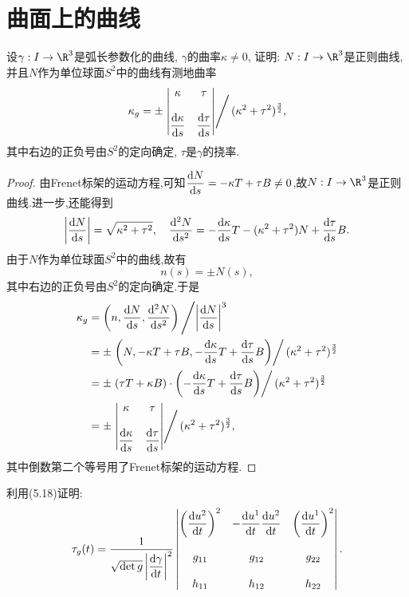 \section{曲面上的曲线}
\begin{excise}
		设$\gamma: I\to \R^{3}$是弧长参数化的曲线, $\gamma$的曲率$\kappa \neq 0$,
		证明: $N:I\to\R^{3}$是正则曲线,并且$N$作为单位球面$S^{2}$中的曲线有测地曲率
		$$
		\kappa_{g}=\pm\left.
		\begin{vmatrix}
			\kappa&\tau\\ \\
			\dfrac{\mathrm{d}\kappa}{\mathrm{d} s}&\dfrac{\mathrm{d}\tau}{\mathrm{d} s}
		\end{vmatrix}\right/(\kappa^{2}+\tau^{2})^{\frac{3}{2}},
		$$
		其中右边的正负号由$S^{2}$的定向确定, $\tau$是$\gamma$的挠率.
	\end{excise}
	\begin{proof}
		由Frenet标架的运动方程,可知$\dfrac{\mathrm{d} N}{\mathrm{d} s}=-\kappa T+\tau B\neq 0$,故$N:I\to\R^{3}$是正则曲线.进一步,还能得到
		$$
		\left|\frac{\mathrm{d} N}{\mathrm{d} s}\right|=\sqrt{\kappa^{2}+\tau^{2}},\quad \frac{\mathrm{d}^{2} N}{\mathrm{d} s^{2}}=-\frac{\mathrm{d} \kappa}{\mathrm{d} s}T-(\kappa^{2}+\tau^{2})N+\frac{\mathrm{d} \tau}{\mathrm{d} s}B.
		$$
		由于$N$作为单位球面$S^{2}$中的曲线,故有
		$$
		n(s)=\pm N(s),
		$$
		其中右边的正负号由$S^{2}$的定向确定.于是
		\begin{align*}
			\kappa_{g}&=\left(n,\frac{\mathrm{d} N}{\mathrm{d} s},\frac{\mathrm{d}^{2} N}{\mathrm{d} s^{2}}\right)\left/\left|\frac{\mathrm{d} N}{\mathrm{d} s}\right|^{3}\right.\\
			&=\pm\left.\left(N,-\kappa T+\tau B,-\frac{\mathrm{d} \kappa}{\mathrm{d} s}T+\frac{\mathrm{d} \tau}{\mathrm{d} s}B\right)\right/(\kappa^{2}+\tau^{2})^{\frac{3}{2}}\\
			&=\pm\left.(\tau T+\kappa B)\cdot \left(-\frac{\mathrm{d} \kappa}{\mathrm{d} s}T+\frac{\mathrm{d} \tau}{\mathrm{d} s}B\right)\right/(\kappa^{2}+\tau^{2})^{\frac{3}{2}}\\
			&=\pm\left.
			\begin{vmatrix}
				\kappa&\tau\\ \\
				\dfrac{\mathrm{d}\kappa}{\mathrm{d} s}&\dfrac{\mathrm{d}\tau}{\mathrm{d} s}
			\end{vmatrix}\right/(\kappa^{2}+\tau^{2})^{\frac{3}{2}},
		\end{align*}
		其中倒数第二个等号用了Frenet标架的运动方程.
	\end{proof}
	\begin{excise}
		利用(5.18)证明:
		$$
		\tau_{g}(t)=\frac{1}{\sqrt{\det g}\left| \dfrac{\mathrm{d}\gamma}{\mathrm{d} t} \right|^{2}}
		\begin{vmatrix}
			\left( \dfrac{\mathrm{d} u^{2}}{\mathrm{d} t} \right)^{2}&-\dfrac{\mathrm{d} u^{1}}{\mathrm{d} t}\dfrac{\mathrm{d} u^{2}}{\mathrm{d} t}&\left( \dfrac{\mathrm{d} u^{1}}{\mathrm{d} t} \right)^{2}\\ \\
			g_{11}&g_{12}&g_{22}\\ \\
			h_{11}&h_{12}&h_{22}
		\end{vmatrix}.
		$$
	\end{excise}
